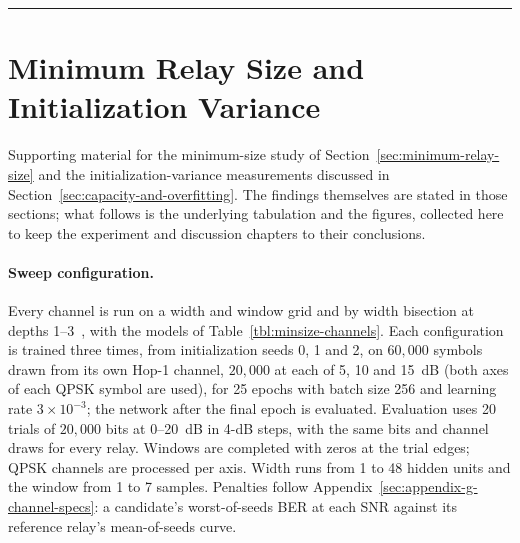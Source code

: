\begin{center}\rule{0.5\linewidth}{0.5pt}\end{center}



\section{Minimum Relay Size and Initialization Variance}\label{sec:appendix-f-minimum-size}

Supporting material for the minimum-size study of Section~\ref{sec:minimum-relay-size} and the initialization-variance measurements discussed in Section~\ref{sec:capacity-and-overfitting}. The findings themselves are stated in those sections; what follows is the underlying tabulation and the figures, collected here to keep the experiment and discussion chapters to their conclusions.

\paragraph{Sweep configuration.} Every channel is run on a width and window grid and by width bisection at depths 1--3~, with the models of Table~\ref{tbl:minsize-channels}. Each configuration is trained three times, from initialization seeds 0, 1 and 2, on $60{,}000$ symbols drawn from its own Hop-1 channel, $20{,}000$ at each of 5, 10 and 15~dB (both axes of each QPSK symbol are used), for 25 epochs with batch size 256 and learning rate $3\times10^{-3}$; the network after the final epoch is evaluated. Evaluation uses 20 trials of $20{,}000$ bits at 0--20~dB in 4-dB steps, with the same bits and channel draws for every relay. Windows are completed with zeros at the trial edges; QPSK channels are processed per axis. Width runs from 1 to 48 hidden units and the window from 1 to 7 samples. Penalties follow Appendix~\ref{sec:appendix-g-channel-specs}: a candidate's worst-of-seeds BER at each SNR against its reference relay's mean-of-seeds curve.

